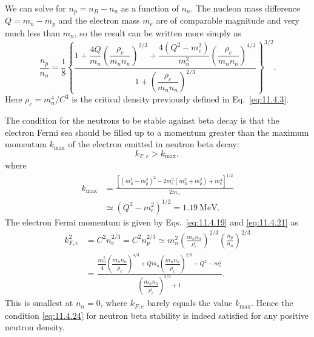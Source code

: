 We can solve for \(n_p=n_B-n_n\) as a function of \(n_n\). The nucleon mass
difference \(Q=m_n-m_p\) and the electron mass \(m_e\) are of comparable
magnitude and very much less than \(m_n\), so the result can be written more
simply as
\begin{equation}
  \frac{n_p}{n_n}
  =
  \frac18
  \left\{
    \frac{
      1+\dfrac{4Q}{m_n}
        \left(\dfrac{\rho_c}{m_nn_n}\right)^{2/3}
      +\dfrac{4(Q^2-m_e^2)}{m_n^2}
        \left(\dfrac{\rho_c}{m_nn_n}\right)^{4/3}
    }{
      1+\left(\dfrac{\rho_c}{m_nn_n}\right)^{2/3}
    }
  \right\}^{3/2}.
  \tag{11.4.23}\label{eq:11.4.23}
\end{equation}
Here \(\rho_c=m_n^4/C^3\) is the critical density previously defined in
Eq.~\eqref{eq:11.4.3}.

The condition for the neutrons to be stable against beta decay is that the
electron Fermi sea should be filled up to a momentum greater than the maximum
momentum \(k_{\max}\) of the electron emitted in neutron beta decay:
\begin{equation}
  k_{F,e}>k_{\max},
  \tag{11.4.24}\label{eq:11.4.24}
\end{equation}
where
\begin{equation}
  \begin{split}
  k_{\max}
  &=
  \frac{
    [(m_n^2-m_p^2)^2-2m_e^2(m_n^2+m_p^2)+m_e^4]^{1/2}
  }{2m_n}\\
  &\simeq(Q^2-m_e^2)^{1/2}=1.19\ \mathrm{MeV}.
  \end{split}
  \tag{11.4.25}\label{eq:11.4.25}
\end{equation}
The electron Fermi momentum is given by Eqs.~\eqref{eq:11.4.19} and
\eqref{eq:11.4.21} as
\begin{equation}
  \begin{aligned}
  k_{F,e}^2
  &=
  C^2n_e^{2/3}
  =
  C^2n_p^{2/3}
  \simeq
  m_n^2
  \left(\frac{m_nn_n}{\rho_c}\right)^{2/3}
  \left(\frac{n_p}{n_n}\right)^{2/3}\\
  &=
  \frac{
    \dfrac{m_n^2}{4}
      \left(\dfrac{m_nn_n}{\rho_c}\right)^{4/3}
    +Qm_n\left(\dfrac{m_nn_n}{\rho_c}\right)^{2/3}
    +Q^2-m_e^2
  }{
    \left(\dfrac{m_nn_n}{\rho_c}\right)^{2/3}+1
  }.
  \end{aligned}
  \tag{11.4.26}\label{eq:11.4.26}
\end{equation}
This is smallest at \(n_n=0\), where \(k_{F,e}\) barely equals the value
\(k_{\max}\). Hence the condition \eqref{eq:11.4.24} for neutron beta
stability is indeed satisfied for any positive neutron density.

